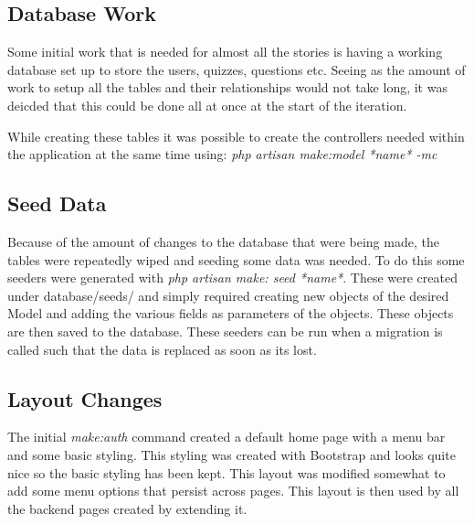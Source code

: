 \documentclass{article}
\begin{document}
\subsection{Database Work}
Some initial work that is needed for almost all the stories is having a working database set up to store the users, quizzes, questions etc. Seeing as the amount of work to setup all the tables and their relationships would not take long, it was deicded that this could be done all at once at the start of the iteration.

While creating these tables it was possible to create the controllers needed within the application at the same time using: \textit{php artisan make:model *name* -mc } 
\subsection{Seed Data}
Because of the amount of changes to the database that were being made, the tables were repeatedly wiped and seeding some data was needed. To do this some seeders were generated with \textit{php artisan make: seed *name*}. These were created under database/seeds/ and simply required creating new objects of the desired Model and adding the various fields as parameters of the objects. These objects are then saved to the database. These seeders can be run when a migration is called such that the data is replaced as soon as its lost.
\subsection{Layout Changes}
The initial \textit{make:auth} command created a default home page with a menu bar and some basic styling. This styling was created with Bootstrap and looks quite nice so the basic styling has been kept. This layout was modified somewhat to add some menu options that persist across pages. This layout is then used by all the backend pages created by extending it.

%
%
\end{document}
